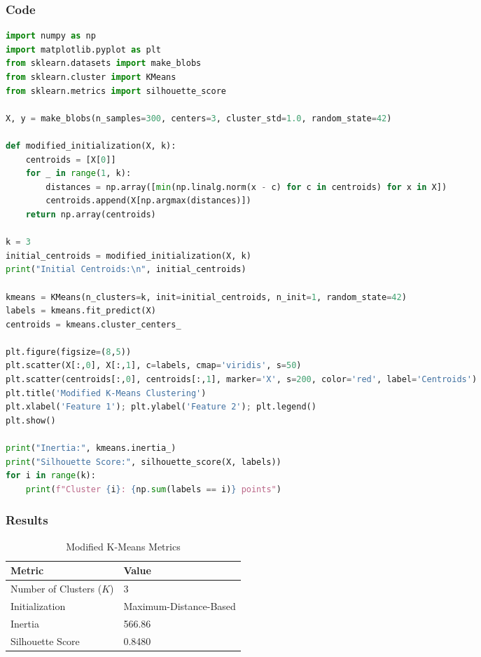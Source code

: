 \documentclass[a4paper,10pt]{article}
\begin{document}
\subsubsection{Code}
\begin{lstlisting}[language=Python, caption={Modified K-Means Implementation}]
import numpy as np
import matplotlib.pyplot as plt
from sklearn.datasets import make_blobs
from sklearn.cluster import KMeans
from sklearn.metrics import silhouette_score

X, y = make_blobs(n_samples=300, centers=3, cluster_std=1.0, random_state=42)

def modified_initialization(X, k):
    centroids = [X[0]]
    for _ in range(1, k):
        distances = np.array([min(np.linalg.norm(x - c) for c in centroids) for x in X])
        centroids.append(X[np.argmax(distances)])
    return np.array(centroids)

k = 3
initial_centroids = modified_initialization(X, k)
print("Initial Centroids:\n", initial_centroids)

kmeans = KMeans(n_clusters=k, init=initial_centroids, n_init=1, random_state=42)
labels = kmeans.fit_predict(X)
centroids = kmeans.cluster_centers_

plt.figure(figsize=(8,5))
plt.scatter(X[:,0], X[:,1], c=labels, cmap='viridis', s=50)
plt.scatter(centroids[:,0], centroids[:,1], marker='X', s=200, color='red', label='Centroids')
plt.title('Modified K-Means Clustering')
plt.xlabel('Feature 1'); plt.ylabel('Feature 2'); plt.legend()
plt.show()

print("Inertia:", kmeans.inertia_)
print("Silhouette Score:", silhouette_score(X, labels))
for i in range(k):
    print(f"Cluster {i}: {np.sum(labels == i)} points")
\end{lstlisting}

\subsubsection{Results}
\begin{table}[H]
\centering
\caption{Modified K-Means Metrics}
\begin{tabular}{ll}
\toprule
\textbf{Metric} & \textbf{Value} \\
\midrule
Number of Clusters (\(K\)) & 3 \\
Initialization & Maximum-Distance-Based \\
Inertia & 566.86 \\
Silhouette Score & 0.8480 \\
\bottomrule
\end{tabular}
\end{table}
\end{document}
